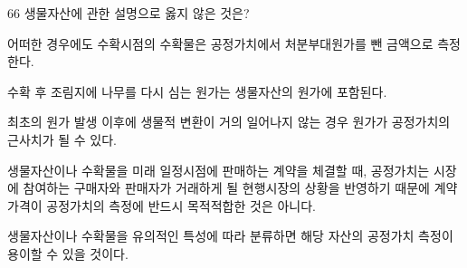 \begin{question}{66}
생물자산에 관한 설명으로 옳지 않은 것은?
\begin{choices}
  \item 어떠한 경우에도 수확시점의 수확물은 공정가치에서 처분부대원가를 뺀 금액으로 측정한다.
  \item 수확 후 조림지에 나무를 다시 심는 원가는 생물자산의 원가에 포함된다.
  \item 최초의 원가 발생 이후에 생물적 변환이 거의 일어나지 않는 경우 원가가 공정가치의 근사치가 될 수 있다.
  \item 생물자산이나 수확물을 미래 일정시점에 판매하는 계약을 체결할 때, 공정가치는 시장에 참여하는 구매자와 판매자가 거래하게 될 현행시장의 상황을 반영하기 때문에 계약가격이 공정가치의 측정에 반드시 목적적합한 것은 아니다.
  \item 생물자산이나 수확물을 유의적인 특성에 따라 분류하면 해당 자산의 공정가치 측정이 용이할 수 있을 것이다.
\end{choices}
\end{question}
